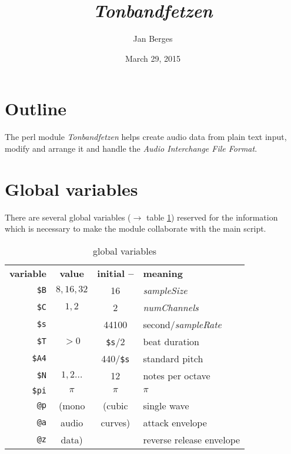 \documentclass[a4paper, 10pt]{article}
\title{\itshape \ttfamily Tonbandfetzen}
\author{Jan Berges}
\date{March 29, 2015}
\begin{document}
	\maketitle

	\section*{Outline}

	The perl module {\it Tonbandfetzen} helps create audio data from plain text input, modify and arrange it and handle the {\it Audio Interchange File Format}.

	\section*{Global variables}

	There are several global variables ($\rightarrow$ table \ref{variables}) reserved for the information which is necessary to make the module collaborate with the main script.
	\begin{table}[H]
		\centering
		\begin{tabular}
		    { r            c              c                  l }
			{\bf variable} & {\bf value}  & {\bf initial --} & {\bf meaning}            \\
			\verb|$B|      & $8, 16, 32$  & 16               & {\it sampleSize}         \\
			\verb|$C|      & $1, 2$       & 2                & {\it numChannels}        \\
			\verb|$s|      &              & 44100            & second/{\it sampleRate}  \\
			\verb|$T|      & $> 0$        & \verb|$s|/2      & beat duration            \\
			\verb|$A4|     &              & 440/\verb|$s|    & standard pitch           \\
			\verb|$N|      & $1, 2\hdots$ & 12               & notes per octave         \\
			\verb|$pi|     & $\pi$        & $\pi$            & $\pi$                    \\
			\verb|@p|      & (mono        & (cubic           & single wave              \\
			\verb|@a|      & audio        & curves)          & attack envelope          \\
			\verb|@z|      & data)        &                  & reverse release envelope \\
		\end{tabular}
		\caption{global variables}
		\label{variables}
	\end{table}
\end{document}
